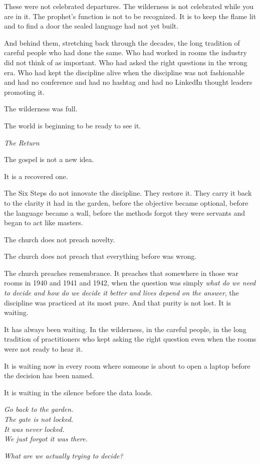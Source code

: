 These were not celebrated departures. The wilderness is not celebrated while you are in it. The prophet's function is not to be recognized. It is to keep the flame lit and to find a door the sealed language had not yet built.

And behind them, stretching back through the decades, the long tradition of careful people who had done the same. Who had worked in rooms the industry did not think of as important. Who had asked the right questions in the wrong era. Who had kept the discipline alive when the discipline was not fashionable and had no conference and had no hashtag and had no LinkedIn thought leaders promoting it.

The wilderness was full.

The world is beginning to be ready to see it.

\vspace{1.5em}
\begin{center}
  \small\itshape The Return
\end{center}
\vspace{1.5em}

The gospel is not a new idea.

It is a recovered one.

The Six Steps do not innovate the discipline. They restore it. They carry it back to the clarity it had in the garden, before the objective became optional, before the language became a wall, before the methods forgot they were servants and began to act like masters.

The church does not preach novelty.

The church does not preach that everything before was wrong.

The church preaches remembrance. It preaches that somewhere in those war rooms in 1940 and 1941 and 1942, when the question was simply \textit{what do we need to decide and how do we decide it better and lives depend on the answer}, the discipline was practiced at its most pure. And that purity is not lost. It is waiting.

It has always been waiting. In the wilderness, in the careful people, in the long tradition of practitioners who kept asking the right question even when the rooms were not ready to hear it.

It is waiting now in every room where someone is about to open a laptop before the decision has been named.

It is waiting in the silence before the data loads.

\vspace{2em}
\begin{center}
  \itshape Go back to the garden.\\
  The gate is not locked.\\
  It was never locked.\\
  We just forgot it was there.
\end{center}

\vspace{1.5em}
\begin{center}
  \itshape What are we actually trying to decide?
\end{center}
